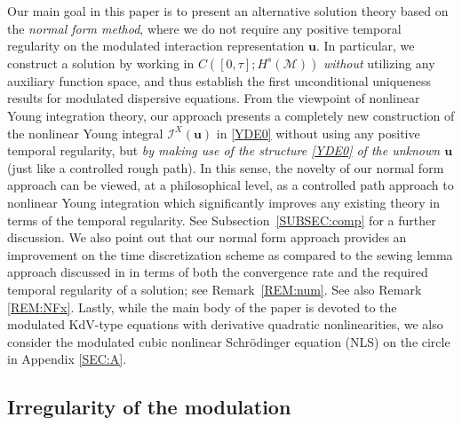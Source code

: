 \documentclass[letterpaper, 11pt,  reqno]{amsart}
\newcommand{\1}{\hspace{0.5mm}\text{I}\hspace{0.5mm}}
\newcommand{\I}{\mathcal{I}}
\newcommand{\M}{\mathcal{M}}
\newcommand{\uu}{\mathbf{u}}
\numberwithin{equation}{section}
\numberwithin{theorem}{section}
\begin{document}
Our main goal in this paper is to present
an alternative solution theory based
on the {\it normal form method}, 
where we do not require any positive  temporal regularity on
the modulated interaction representation $\uu$.
In particular, we construct a solution 
by working  in $C([0, \tau]; H^s(\M))$
{\it without} utilizing any auxiliary function space, 
and thus establish 
the first unconditional uniqueness results
for  modulated dispersive equations.
From the viewpoint of nonlinear Young integration theory, 
our approach 
presents a completely new construction 
of the nonlinear Young integral $\I^X(\uu)$
in \eqref{YDE0}
 without using any positive temporal regularity, 
but {\it by making use of 
the structure \eqref{YDE0}
of the unknown $\uu$}
(just like a controlled rough path).
In this sense, the novelty of 
our normal form approach
can be viewed,  
at a philosophical level, 
as 
a controlled path approach
to nonlinear Young integration
which 
significantly improves any existing theory
in terms of the temporal regularity.
See Subsection~\ref{SUBSEC:comp}
for a further discussion.
We also point out that our
normal form approach
provides an improvement on  
 the time discretization scheme
as compared to  the sewing lemma approach 
discussed in  \cite[Subsection~2.3]{CG1}
in terms of both the convergence rate and 
the required temporal regularity of a solution;
see
Remark~\ref{REM:num}.
See also Remark \ref{REM:NFx}.
Lastly, while the main body of the paper is devoted
to the modulated KdV-type 
equations with derivative quadratic nonlinearities, 
we also consider 
the modulated cubic nonlinear Schr\"odinger equation (NLS)
on the circle
in Appendix \ref{SEC:A}.

















 














\subsection{Irregularity of the modulation}
\end{document}
